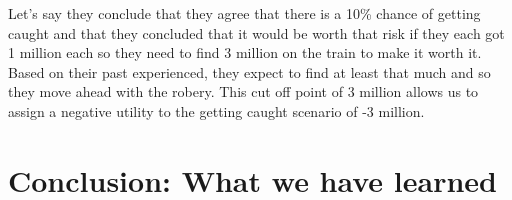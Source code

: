 \documentclass[12pt]{article}
\begin{document}
Let's say they conclude that they agree that there is a 10\% chance of getting caught
and that they concluded that it would be worth that risk if they each
got 1 million each so they need to find 3 million on the train to 
make it worth it. Based on their past experienced, they expect to find
at least that much and so they move ahead with the robery. This cut
off point of 3 million allows us to assign a negative utility to the
getting caught scenario of -3 million. 


\section{Conclusion: What we have learned}
\end{document}
